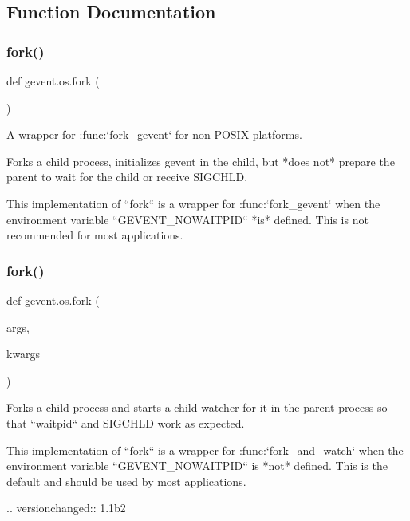 \subsection{Function Documentation}
\mbox{\label{namespacegevent_1_1os_a7d22bcbe03e198e484217634c2611b7e}} 
\subsubsection{\texorpdfstring{fork()}{fork()}\hspace{0.1cm}{\footnotesize\ttfamily [1/2]}}
{\footnotesize\ttfamily def gevent.\+os.\+fork (\begin{DoxyParamCaption}{ }\end{DoxyParamCaption})}

\begin{DoxyVerb}A wrapper for :func:`fork_gevent` for non-POSIX platforms.
\end{DoxyVerb}


\begin{DoxyVerb}Forks a child process, initializes gevent in the child,
but *does not* prepare the parent to wait for the child or receive SIGCHLD.

This implementation of ``fork`` is a wrapper for :func:`fork_gevent`
when the environment variable ``GEVENT_NOWAITPID`` *is* defined.
This is not recommended for most applications.
\end{DoxyVerb}
 \mbox{\label{namespacegevent_1_1os_a333943be729b41ab9ebc1402d8fb7992}} 
\subsubsection{\texorpdfstring{fork()}{fork()}\hspace{0.1cm}{\footnotesize\ttfamily [2/2]}}
{\footnotesize\ttfamily def gevent.\+os.\+fork (\begin{DoxyParamCaption}\item[{}]{args,  }\item[{}]{kwargs }\end{DoxyParamCaption})}

\begin{DoxyVerb}Forks a child process and starts a child watcher for it in the
parent process so that ``waitpid`` and SIGCHLD work as expected.

This implementation of ``fork`` is a wrapper for :func:`fork_and_watch`
when the environment variable ``GEVENT_NOWAITPID`` is *not* defined.
This is the default and should be used by most applications.

.. versionchanged:: 1.1b2
\end{DoxyVerb}
 \mbox{\label{namespacegevent_1_1os_a536e814c326f318e9bae710344de11d6}} 
